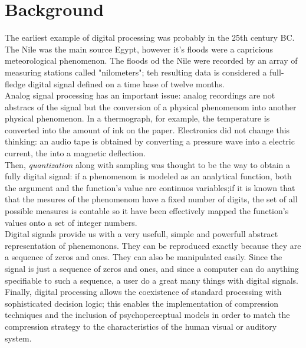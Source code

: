 \documentclass[letterpaper]{article}
\begin{document}
\section{Background}
The earliest example of digital processing was probably in the 25th century BC. The Nile was the main source Egypt, however it's floods were a capricious meteorological phenomenon. The floods od the Nile were recorded by an array of measuring stations called "nilometers"; teh resulting data is considered a full-fledge digital signal defined on a time base of twelve months.\\
Analog signal processing has an important issue: analog recordings are not abstracs of the signal but the conversion of a physical phenomenom into another physical phenomenon. In a thermograph, for example, the temperature is converted into the amount of ink on the paper. Electronics did not change this thinking: an audio tape is obtained by converting a pressure wave into a electric current, the into a magnetic deflection. \\
Then, \textit{quantization} along with sampling was thought to be the way to obtain a fully digital signal: if a phenomenom is modeled as an analytical function, both the argument and the function's value are continuos variables;if it is known that that the mesures of the phenomenom have a fixed number of digits, the set of all possible measures is contable so it have been effectively mapped the function's values onto a set of integer numbers.\\
Digital signals provide us with a very usefull, simple and powerfull abstract representation of phenemonons. They can be reproduced exactly because they are a sequence of zeros and ones. They can also be manipulated easily. Since the signal is just a sequence of zeros and ones, and since a computer can do anything specifiable to such a sequence, a user do a great many things with digital signals.\\
Finally, digital processing allows the coexistence of standard processing with sophisticated decision logic; this enables the implementation of compression techniques and the inclusion of psychoperceptual models in order to match the compression strategy to the characteristics of the human visual or auditory system. 
\end{document}
